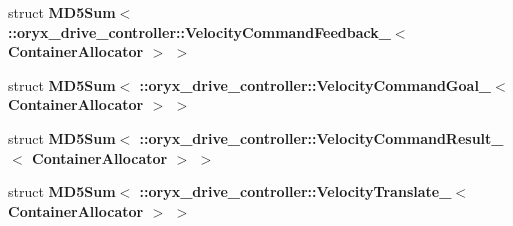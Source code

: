 \begin{DoxyCompactItemize}
\item 
struct {\bf \-M\-D5\-Sum$<$ \-::oryx\-\_\-drive\-\_\-controller\-::\-Velocity\-Command\-Feedback\-\_\-$<$ Container\-Allocator $>$ $>$}
\item 
struct {\bf \-M\-D5\-Sum$<$ \-::oryx\-\_\-drive\-\_\-controller\-::\-Velocity\-Command\-Goal\-\_\-$<$ Container\-Allocator $>$ $>$}
\item 
struct {\bf \-M\-D5\-Sum$<$ \-::oryx\-\_\-drive\-\_\-controller\-::\-Velocity\-Command\-Result\-\_\-$<$ Container\-Allocator $>$ $>$}
\item 
struct {\bf \-M\-D5\-Sum$<$ \-::oryx\-\_\-drive\-\_\-controller\-::\-Velocity\-Translate\-\_\-$<$ Container\-Allocator $>$ $>$}
\end{DoxyCompactItemize}
